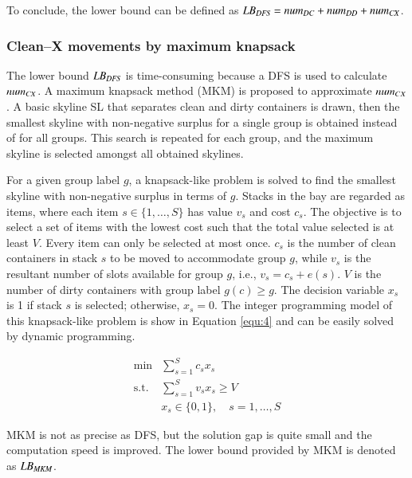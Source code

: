 \documentclass[review,3p,times,authoryear,12pt]{elsarticle}
\begin{document}
To conclude, the lower bound can be defined as $\id{LB}_\id{DFS}=\id{num}_\id{DC}+\id{num}_\id{DD}+\id{num}_\id{CX}$.

\subsubsection{Clean--X movements by maximum knapsack}

The lower bound $\id{LB}_\id{DFS}$ is time-consuming because a DFS is used to calculate $\id{num}_{\id{CX}}$. A maximum knapsack method (MKM) is proposed to approximate $\id{num}_{CX}$. A basic skyline SL that separates clean and dirty containers is drawn, then the smallest skyline with non-negative surplus for a single group is obtained instead of for all groups. This search is repeated for each group, and the maximum skyline is selected amongst all obtained skylines.

For a given group label $g$, a knapsack-like problem is solved to find the smallest skyline with non-negative surplus in terms of $g$. Stacks in the bay are regarded as items, where each item $s\in\{1,\dots,S\}$ has value $v_s$ and cost $c_s$. The objective is to select a set of items with the lowest cost such that the total value selected is at least $V$. Every item can only be selected at most once. $c_s$ is the number of clean containers in stack $s$ to be moved to accommodate group $g$, while $v_s$ is the resultant number of slots available for group $g$, i.e., $v_s=c_s+e(s)$. $V$ is the number of dirty containers with group label $g(c)\ge g$. The decision variable $x_s$ is 1 if stack $s$ is selected; otherwise, $x_s=0$. The integer programming model of this knapsack-like problem is show in Equation \ref{equ:4} and can be easily solved by dynamic programming.


\begin{equation}
\label{equ:4}
\begin{array}{rl}
\min & \sum\limits_{s=1}^S c_s x_s\\
\mathrm{s.t.} &\sum\limits_{s=1}^S v_s x_s\ge V\\
&x_s\in\{0,1\}, \quad s=1,\dots,S
\end{array}
\end{equation}

MKM is not as precise as DFS, but the solution gap is quite small and the computation speed is improved. The lower bound provided by MKM is denoted as $\id{LB}_{\id{MKM}}$.
\end{document}
